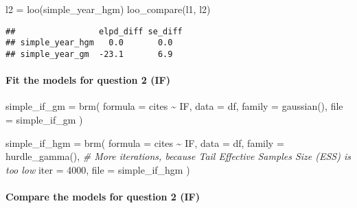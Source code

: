 \documentclass[
]{article}
\newenvironment{Shaded}{\begin{snugshade}}{\end{snugshade}}
\newcommand{\AttributeTok}[1]{\textcolor[rgb]{0.77,0.63,0.00}{#1}}
\newcommand{\CommentTok}[1]{\textcolor[rgb]{0.56,0.35,0.01}{\textit{#1}}}
\newcommand{\DecValTok}[1]{\textcolor[rgb]{0.00,0.00,0.81}{#1}}
\newcommand{\FunctionTok}[1]{\textcolor[rgb]{0.00,0.00,0.00}{#1}}
\newcommand{\NormalTok}[1]{#1}
\newcommand{\OtherTok}[1]{\textcolor[rgb]{0.56,0.35,0.01}{#1}}
\newcommand{\SpecialCharTok}[1]{\textcolor[rgb]{0.00,0.00,0.00}{#1}}
\newcommand{\StringTok}[1]{\textcolor[rgb]{0.31,0.60,0.02}{#1}}
\begin{document}
\begin{Shaded}
\begin{Highlighting}[]
\NormalTok{l2 }\OtherTok{=} \FunctionTok{loo}\NormalTok{(simple\_year\_hgm)}
\FunctionTok{loo\_compare}\NormalTok{(l1, l2)}
\end{Highlighting}
\end{Shaded}

\begin{verbatim}
##                 elpd_diff se_diff
## simple_year_hgm   0.0       0.0  
## simple_year_gm  -23.1       6.9
\end{verbatim}

\hypertarget{fit-the-models-for-question-2-if}{%
\paragraph{Fit the models for question 2
(IF)}\label{fit-the-models-for-question-2-if}}

\begin{Shaded}
\begin{Highlighting}[]
\NormalTok{simple\_if\_gm }\OtherTok{=} \FunctionTok{brm}\NormalTok{(}
  \AttributeTok{formula =}\NormalTok{ cites }\SpecialCharTok{\textasciitilde{}}\NormalTok{ IF,}
  \AttributeTok{data =}\NormalTok{ df,}
  \AttributeTok{family =} \FunctionTok{gaussian}\NormalTok{(),}
  \AttributeTok{file =} \StringTok{\textquotesingle{}simple\_if\_gm\textquotesingle{}}
\NormalTok{)}
\end{Highlighting}
\end{Shaded}

\begin{Shaded}
\begin{Highlighting}[]
\NormalTok{simple\_if\_hgm }\OtherTok{=} \FunctionTok{brm}\NormalTok{(}
  \AttributeTok{formula =}\NormalTok{ cites }\SpecialCharTok{\textasciitilde{}}\NormalTok{ IF,}
  \AttributeTok{data =}\NormalTok{ df,}
  \AttributeTok{family =} \FunctionTok{hurdle\_gamma}\NormalTok{(),}
  \CommentTok{\# More iterations, because Tail Effective Samples Size (ESS) is too low}
  \AttributeTok{iter =} \DecValTok{4000}\NormalTok{,}
  \AttributeTok{file =} \StringTok{\textquotesingle{}simple\_if\_hgm\textquotesingle{}}
\NormalTok{)}
\end{Highlighting}
\end{Shaded}

\hypertarget{compare-the-models-for-question-2-if}{%
\paragraph{Compare the models for question 2
(IF)}\label{compare-the-models-for-question-2-if}}
\end{document}

